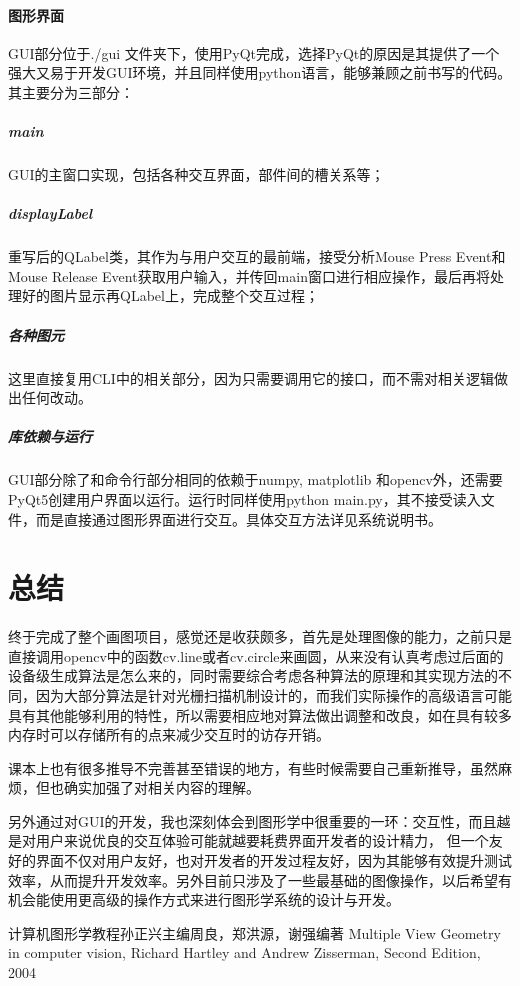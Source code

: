 \documentclass[a4paper,UTF8]{article}
\theoremstyle{definition}
\begin{document}
\paragraph{图形界面} GUI部分位于./gui 文件夹下，使用PyQt完成，选择PyQt的原因是其提供了一个强大又易于开发GUI环境，并且同样使用python语言，能够兼顾之前书写的代码。其主要分为三部分：
\subparagraph{main} GUI的主窗口实现，包括各种交互界面，部件间的槽关系等；
\subparagraph{displayLabel} 重写后的QLabel类，其作为与用户交互的最前端，接受分析Mouse Press Event和Mouse Release Event获取用户输入，并传回main窗口进行相应操作，最后再将处理好的图片显示再QLabel上，完成整个交互过程；
\subparagraph{各种图元} 这里直接复用CLI中的相关部分，因为只需要调用它的接口，而不需对相关逻辑做出任何改动。
\subparagraph{库依赖与运行}
GUI部分除了和命令行部分相同的依赖于numpy, matplotlib 和opencv外，还需要PyQt5创建用户界面以运行。运行时同样使用python main.py，其不接受读入文件，而是直接通过图形界面进行交互。具体交互方法详见系统说明书。
\section{总结}
\paragraph{} 终于完成了整个画图项目，感觉还是收获颇多，首先是处理图像的能力，之前只是直接调用opencv中的函数cv.line或者cv.circle来画圆，从来没有认真考虑过后面的设备级生成算法是怎么来的，同时需要综合考虑各种算法的原理和其实现方法的不同，因为大部分算法是针对光栅扫描机制设计的，而我们实际操作的高级语言可能具有其他能够利用的特性，所以需要相应地对算法做出调整和改良，如在具有较多内存时可以存储所有的点来减少交互时的访存开销。
\par 课本上也有很多推导不完善甚至错误的地方，有些时候需要自己重新推导，虽然麻烦，但也确实加强了对相关内容的理解。
\par 另外通过对GUI的开发，我也深刻体会到图形学中很重要的一环：交互性，而且越是对用户来说优良的交互体验可能就越要耗费界面开发者的设计精力，
但一个友好的界面不仅对用户友好，也对开发者的开发过程友好，因为其能够有效提升测试效率，从而提升开发效率。另外目前只涉及了一些最基础的图像操作，以后希望有机会能使用更高级的操作方式来进行图形学系统的设计与开发。
\begin{thebibliography}{2019}
 计算机图形学教程\quad 孙正兴主编\quad 周良，郑洪源，谢强编著
 Multiple View Geometry in computer vision, Richard Hartley and Andrew Zisserman, Second Edition, 2004
\end{thebibliography}
\end{document}
